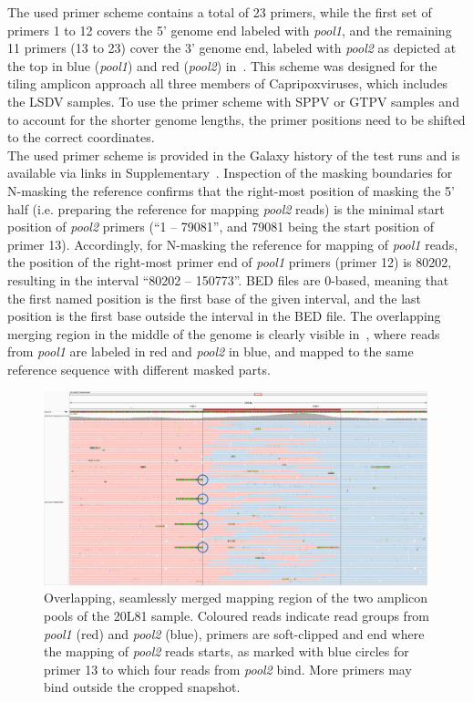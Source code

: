 The used primer scheme contains a total of 23 primers, while the first set of primers 1 to 12 covers the 5' genome end labeled with \textit{pool1}, and the remaining 11 primers (13 to 23) cover the 3' genome end, labeled with \textit{pool2} as depicted at the top in blue (\textit{pool1}) and red (\textit{pool2}) in~. This scheme was designed for the tiling amplicon approach all three members of Capripoxviruses, which includes the \ac{LSDV} samples. To use the primer scheme with \ac{SPPV} or \ac{GTPV} samples and to account for the shorter genome lengths, the primer positions need to be shifted to the correct coordinates.\\
The used primer scheme is provided in the Galaxy history of the test runs and is available via links in Supplementary~. Inspection of the masking boundaries for N-masking the reference confirms that the right-most position of masking the 5' half (i.e. preparing the reference for mapping \textit{pool2} reads) is the minimal start position of \textit{pool2} primers (``1 -- 79081'', and 79081 being the start position of primer 13). Accordingly, for N-masking the reference for mapping of \textit{pool1} reads, the position of the right-most primer end of \textit{pool1} primers (primer 12) is 80202, resulting in the interval ``80202 -- 150773''. \ac{BED} files are 0-based, meaning that the first named position is the first base of the given interval, and the last position is the first base outside the interval in the \ac{BED} file. The overlapping merging region in the middle of the genome is clearly visible in~, where reads from \textit{pool1} are labeled in red and \textit{pool2} in blue, and mapped to the same reference sequence with different masked parts. 
\begin{figure}[ht!]
    \centering
    \hspace*{-24pt}
    \includegraphics[width=1.1\textwidth]{media/4-lsdv-alig-20L81-c.png}
    \caption[Overlapping reads region of LSDV mapping in 20L81 sample.]{Overlapping, seamlessly merged mapping region of the two amplicon pools of the 20L81 sample. Coloured reads indicate read groups from \textit{pool1} (red) and \textit{pool2} (blue), primers are soft-clipped and end where the mapping of \textit{pool2} reads starts, as marked with blue circles for primer 13 to which four reads from \textit{pool2} bind. More primers may bind outside the cropped snapshot.}
    \label{fig:4-lsdv-read-groups}
\end{figure}

